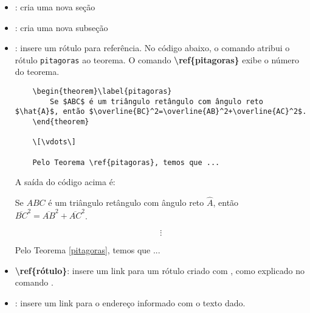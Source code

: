 \begin{itemize}
    \item {}: cria uma nova seção
    \item {}: cria uma nova subseção
    \item {}: insere um rótulo para referência.
    No código abaixo, o comando  atribui o rótulo \texttt{pitagoras} ao teorema. O comando \textbf{\backslash ref\{pitagoras\}} exibe o número do teorema.
    \begin{verbatim}
    \begin{theorem}\label{pitagoras}
        Se $ABC$ é um triângulo retângulo com ângulo reto $\hat{A}$, então $\overline{BC}^2=\overline{AB}^2+\overline{AC}^2$.
    \end{theorem}
    
    \[\vdots\]
    
    Pelo Teorema \ref{pitagoras}, temos que ...
    \end{verbatim}
    
    A saída do código acima é:
    \begin{theorem}\label{pitagoras}
        Se $ABC$ é um triângulo retângulo com ângulo reto $\hat{A}$, então $\overline{BC}^2=\overline{AB}^2+\overline{AC}^2$.
    \end{theorem}
    
    \[\vdots\]
    
    Pelo Teorema \ref{pitagoras}, temos que ...
    
    
    \item \textbf{\backslash ref\{rótulo\}}: insere um link para um rótulo criado com , como explicado no comando .
    
    
    \item {}: insere um link para o endereço informado com o texto dado.
\end{itemize}

